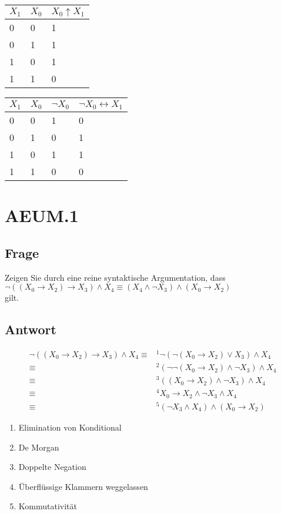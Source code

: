 \documentclass[12pt, a4paper]{article}
\begin{document}
\begin{tabular}{|l|l|l|}
\hline
$X_1$ & $X_0$ & $X_0 \uparrow X_1$\\ \hline
0 & 0 & 1\\
0 & 1 & 1\\
1 & 0 & 1\\
1 & 1 & 0\\
\hline
\end{tabular}

\begin{tabular}{|l|l|l|l|}
\hline
$X_1$ & $X_0$ & $\neg X_0$ & $\neg X_0 \leftrightarrow X_1$\\ \hline
0 & 0 & 1 & 0\\
0 & 1 & 0 & 1\\
1 & 0 & 1 & 1\\
1 & 1 & 0 & 0\\
\hline
\end{tabular}

\section*{AEUM.1}
\subsection*{Frage}
Zeigen Sie durch eine reine syntaktische Argumentation, dass\\
$\neg ((X_0 \rightarrow X_2) \rightarrow X_3) \wedge X_4 \equiv (X_4 \wedge \neg X_3) \wedge (X_0 \rightarrow X_2)$\\
gilt.
\subsection*{Antwort}
\begin{equation}
\begin{split}
\neg((X_0 \rightarrow X_2) \rightarrow X_3) \wedge X_4 
\equiv&^1 \neg(\neg(X_0 \rightarrow X_2) \vee X_3) \wedge X_4\\
\equiv&^2 (\neg\neg(X_0 \rightarrow X_2) \wedge \neg X_3) \wedge X_4\\
\equiv&^3 ((X_0 \rightarrow X_2) \wedge \neg X_3) \wedge X_4\\
\equiv&^4 X_0 \rightarrow X_2 \wedge \neg X_3 \wedge X_4\\
\equiv&^5 (\neg X_3 \wedge X_4) \wedge (X_0 \rightarrow X_2)
\end{split}
\end{equation}

\begin{enumerate}
\item Elimination von Konditional
\item De Morgan
\item Doppelte Negation
\item Überflüssige Klammern weggelassen
\item Kommutativität
\end{enumerate}
\end{document}
